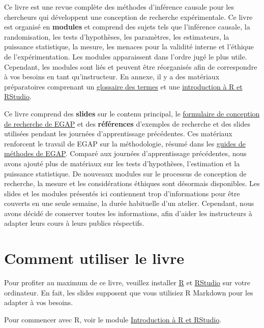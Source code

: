 \documentclass[12pt,]{book}
\begin{document}
Ce livre est une revue complète des méthodes d'inférence causale pour les chercheurs qui développent une conception de recherche expérimentale. Ce livre est organisé en \textbf{modules} et comprend des sujets tels que l'inférence causale, la randomisation, les tests d'hypothèses, les paramètres, les estimateurs, la puissance statistique, la mesure, les menaces pour la validité interne et l'éthique de l'expérimentation. Les modules apparaissent dans l'ordre jugé le plus utile. Cependant, les modules sont liés et peuvent être réorganisés afin de correspondre à vos besoins en tant qu'instructeur. En annexe, il y a des matériaux préparatoires comprenant un \href{glossaire-des-termes.html}{glossaire des termes} et une \href{introduction-à-r-et-rstudio.html}{introduction à R et RStudio}.

Ce livre comprend des \textbf{slides} sur le contenu principal, le \href{researchdesignform.html}{formulaire de conception de recherche de EGAP} et des \textbf{références} d'exemples de recherche et des slides utilisées pendant les journées d'apprentissage précédentes. Ces matériaux renforcent le travail de EGAP sur la méthodologie, résumé dans les \href{https://egap.org/methods-guides/}{guides de méthodes de EGAP}. Comparé aux journées d'apprentissage précédentes, nous avons ajouté plus de matériaux sur les tests d'hypothèses, l'estimation et la puissance statistique. De nouveaux modules sur le processus de conception de recherche, la mesure et les considérations éthiques sont désormais disponibles. Les slides et les modules présentés ici contiennent trop d'informations pour être couverts en une seule semaine, la durée habituelle d'un atelier. Cependant, nous avons décidé de conserver toutes les informations, afin d'aider les instructeurs à adapter leurs cours à leurs publics réspectifs.

\hypertarget{comment-utiliser-le-livre}{%
\section{Comment utiliser le livre}\label{comment-utiliser-le-livre}}

Pour profiter au maximum de ce livre, veuillez installer \href{https://cran.r-project.org/}{R} et \href{https://www.rstudio.com/products/rstudio/download/}{RStudio} sur votre ordinateur. En fait, les slides supposent que vous utilisiez R Markdown pour les adapter à vos besoins.

Pour commencer avec R, voir le module \href{introduction-à-r-et-rstudio.html}{Introduction à R et RStudio}.
\end{document}
